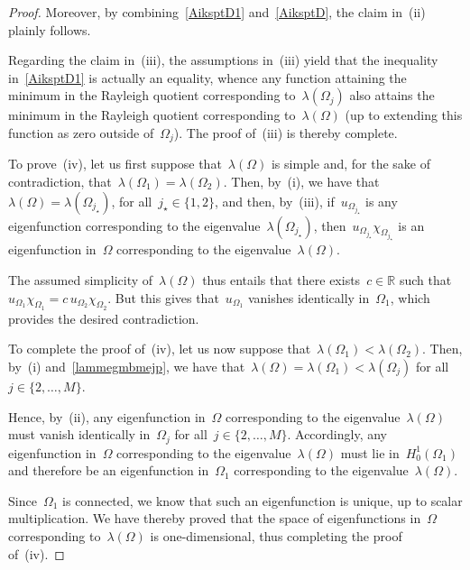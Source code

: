 \documentclass[12pt,a4paper,intlimits,sumlimits]{amsart}
\def \R {\mathbb{R}}
\theoremstyle{definition}
\theoremstyle{plain}
\numberwithin{equation}{section}
\begin{document}
\begin{appendix}
\begin{proof}
Moreover, by combining~\eqref{AiksptD1} and~\eqref{AiksptD}, the claim in~(ii) plainly follows.

Regarding the claim in~(iii), the assumptions in~(iii) yield that the inequality in~\eqref{AiksptD1}
is actually an equality, whence any function attaining the minimum
in the Rayleigh quotient corresponding to~$\lambda(\Omega_j)$
also attains the minimum
in the Rayleigh quotient corresponding to~$\lambda(\Omega)$
(up to extending this function as zero outside of~$\Omega_j$).
The proof of~(iii) is thereby complete.

To prove~(iv), 
let us first suppose that~$\lambda(\Omega)$ is simple and, for the sake of
contradiction, that~$\lambda(\Omega_1)=\lambda(\Omega_2)$.
Then, by~(i), we have that~$\lambda(\Omega)=\lambda(\Omega_{j_\star})$, for all~$j_\star\in\{1,2\}$,
and then, by~(iii), if~$
u_{\Omega_{j_\star}}$ is any eigenfunction corresponding to the eigenvalue~$\lambda(\Omega_{j_\star})$,
then~$u_{\Omega_{j_\star}}\chi_{\Omega_{j_\star}}$ is
an eigenfunction in~$\Omega$ corresponding to the eigenvalue~$\lambda(\Omega)$.

The assumed simplicity of~$\lambda(\Omega)$ thus entails that there exists~$c\in\R$ such that~$ u_{\Omega_{1}}\chi_{\Omega_{1}}=c\,u_{\Omega_{2}}\chi_{\Omega_{2}}$. But this gives that~$u_{\Omega_1}$ vanishes identically
in~$\Omega_1$, which provides the desired contradiction.

To complete the proof of~(iv), let us now suppose that~$\lambda(\Omega_1)<\lambda(\Omega_2)$.
Then, by~(i) and~\eqref{lammegmbmejp}, we have that~$\lambda(\Omega)=\lambda(\Omega_1)<\lambda(\Omega_j)$
for all~$j\in\{2,\dots,M\}$.

Hence, by~(ii), any eigenfunction in~$\Omega$ corresponding to the eigenvalue~$\lambda(\Omega)$
must vanish identically in~$\Omega_j$ for all~$j\in\{2,\dots,M\}$.
Accordingly, any eigenfunction in~$\Omega$ corresponding to the eigenvalue~$\lambda(\Omega)$
must lie in~$H^1_0(\Omega_1)$
and therefore be an eigenfunction in~$\Omega_1$ corresponding to the eigenvalue~$\lambda(\Omega)$.

Since~$\Omega_1$ is connected, we know that such an eigenfunction is unique,
up to scalar multiplication. We have thereby proved that the space of eigenfunctions
in~$\Omega$ corresponding to~$\lambda(\Omega)$ is one-dimensional, thus completing the proof of~(iv).


\end{proof}
\end{appendix}
\end{document}
